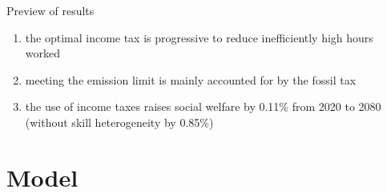 \documentclass[11pt,aspectratio=169]{beamer}
\begin{document}
\begin{frame}{Preview of results}
	\pause
\begin{enumerate}
	\item<+-> the \alert{optimal income tax is progressive}  to reduce inefficiently high hours worked
	\vspace{5mm}
	\item<+->  meeting the emission limit is mainly accounted for by the fossil tax
	\vspace{5mm}
	\item<+-> the use of income taxes \alert{raises social welfare by 0.11\%}   %
	from 2020 to 2080 \\ \small{(without  skill heterogeneity by 0.85\%)}
	
	\vspace{5mm}
\end{enumerate}
\end{frame}

\section{Model}
\end{document}

